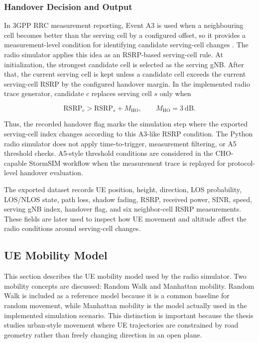\subsubsection{Handover Decision and Output}

In 3GPP RRC measurement reporting, Event A3 is used when a neighbouring cell
becomes better than the serving cell by a configured offset, so it provides a
measurement-level condition for identifying candidate serving-cell changes
\cite{3gpp_38331}. The radio simulator applies this idea as an RSRP-based
serving-cell rule. At initialization, the strongest candidate cell is selected
as the serving gNB. After that, the current serving cell is kept unless a
candidate cell exceeds the current serving-cell RSRP by the configured handover
margin. In the implemented radio trace generator, candidate \(c\) replaces
serving cell \(s\) only when

\begin{equation}
\mathrm{RSRP}_{c}>\mathrm{RSRP}_{s}+M_{\mathrm{HO}},
\qquad M_{\mathrm{HO}}=3~\mathrm{dB}.
\end{equation}

Thus, the recorded handover flag marks the simulation step where the exported
serving-cell index changes according to this A3-like RSRP condition. The Python
radio simulator does not apply time-to-trigger, measurement filtering, or A5
threshold checks. A5-style threshold conditions are considered in the
CHO-capable StormSIM workflow when the measurement trace is replayed for
protocol-level handover evaluation.

The exported dataset records UE position, height, direction, LOS probability,
LOS/NLOS state, path loss, shadow fading, RSRP, received power, SINR, speed,
serving gNB index, handover flag, and six neighbor-cell RSRP measurements. These
fields are later used to inspect how UE movement and altitude affect the radio
conditions around serving-cell changes.

\subsection{UE Mobility Model}
\label{sec:ue-mobility-model}

This section describes the UE mobility model used by the radio simulator. Two mobility concepts are discussed: Random Walk and Manhattan mobility. Random Walk is included as a reference model because it is a common baseline for random movement, while Manhattan mobility is the model actually used in the implemented simulation scenario. This distinction is important because the thesis studies urban-style movement where UE trajectories are constrained by road geometry rather than freely changing direction in an open plane.

